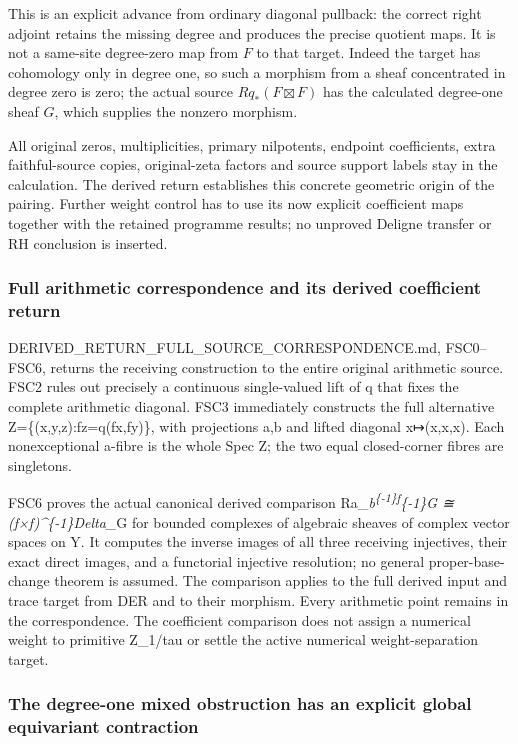 This is an explicit advance from ordinary diagonal pullback: the correct
right adjoint retains the missing degree and produces the precise
quotient maps. It is not a same-site degree-zero map from \(F\) to that
target. Indeed the target has cohomology only in degree one, so such a
morphism from a sheaf concentrated in degree zero is zero; the actual
source \(Rq_*(F\boxtimes F)\) has the calculated degree-one sheaf \(G\),
which supplies the nonzero morphism.

All original zeros, multiplicities, primary nilpotents, endpoint
coefficients, extra faithful-source copies, original-zeta factors and
source support labels stay in the calculation. The derived return
establishes this concrete geometric origin of the pairing. Further
weight control has to use its now explicit coefficient maps together
with the retained programme results; no unproved Deligne transfer or RH
conclusion is inserted.

\subsubsection{Full arithmetic correspondence and its derived
coefficient
return}\label{full-arithmetic-correspondence-and-its-derived-coefficient-return}

DERIVED\_RETURN\_FULL\_SOURCE\_CORRESPONDENCE.md, FSC0--FSC6, returns
the receiving construction to the entire original arithmetic source.
FSC2 rules out precisely a continuous single-valued lift of q that fixes
the complete arithmetic diagonal. FSC3 immediately constructs the full
alternative Z=\{(x,y,z):fz=q(fx,fy)\}, with projections a,b and lifted
diagonal x↦(x,x,x). Each nonexceptional a-fibre is the whole Spec Z; the
two equal closed-corner fibres are singletons.

FSC6 proves the actual canonical derived comparison
Ra\_\emph{b\textsuperscript{\{-1\}f}\{-1\}G ≅ (f×f)\^{}\{-1\}Delta\_}G
for bounded complexes of algebraic sheaves of complex vector spaces on
Y. It computes the inverse images of all three receiving injectives,
their exact direct images, and a functorial injective resolution; no
general proper-base-change theorem is assumed. The comparison applies to
the full derived input and trace target from DER and to their morphism.
Every arithmetic point remains in the correspondence. The coefficient
comparison does not assign a numerical weight to primitive Z\_1/tau or
settle the active numerical weight-separation target.

\subsubsection{The degree-one mixed obstruction has an explicit global
equivariant
contraction}\label{the-degree-one-mixed-obstruction-has-an-explicit-global-equivariant-contraction}

